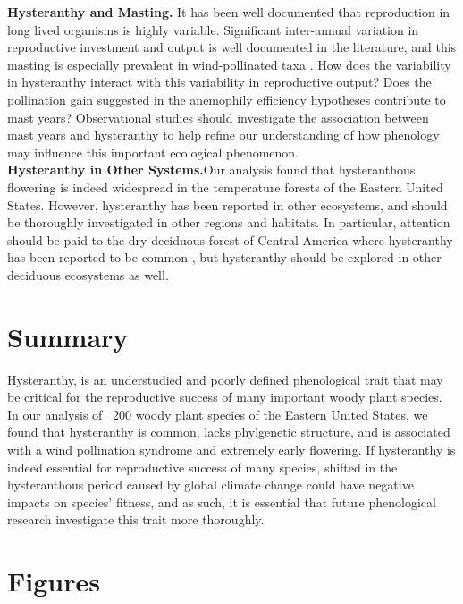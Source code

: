 \documentclass{article}\usepackage[]{graphicx}\usepackage[]{color}
\begin{document}
\textbf{Hysteranthy and Masting.} It has been well documented that reproduction in long lived organisms is highly variable. Significant inter-annual variation in reproductive investment and output \citep{Bogdziewicz2017} is well documented in the literature, and this masting is especially prevalent in wind-pollinated taxa \citep{Kelly}. How does the variability in hysteranthy interact with this variability in reproductive output? Does the pollination gain suggested in the anemophily efficiency hypotheses contribute to mast years? Observational studies should investigate the association between mast years and hysteranthy to help refine our understanding of how phenology may influence this important ecological phenomenon.\\
\indent \textbf{Hysteranthy in Other Systems.}Our analysis found that hysteranthous flowering is indeed widespread in the temperature forests of the Eastern United States. However, hysteranthy has been reported in other ecosystems, and should be thoroughly investigated in other regions and habitats. In particular, attention should be paid to the dry deciduous forest of Central America where hysteranthy has been reported to be common \citep{Janzen1967}, but hysteranthy should be explored in other deciduous ecosystems as well.\\
\section*{Summary}
\indent Hysteranthy, is an understudied and poorly defined phenological trait that may be critical for the reproductive success of many important woody plant species. In our analysis of ~200 woody plant species of the Eastern United States, we found that hysteranthy is common, lacks phylgenetic structure, and is associated with a wind pollination syndrome and extremely early flowering. If hysteranthy is indeed essential for reproductive success of many species, shifted in the hysteranthous period caused by global climate change could have negative impacts on species' fitness, and as such, it is essential that future phenological research investigate this trait more thoroughly.
\section*{Figures}


\end{document}

